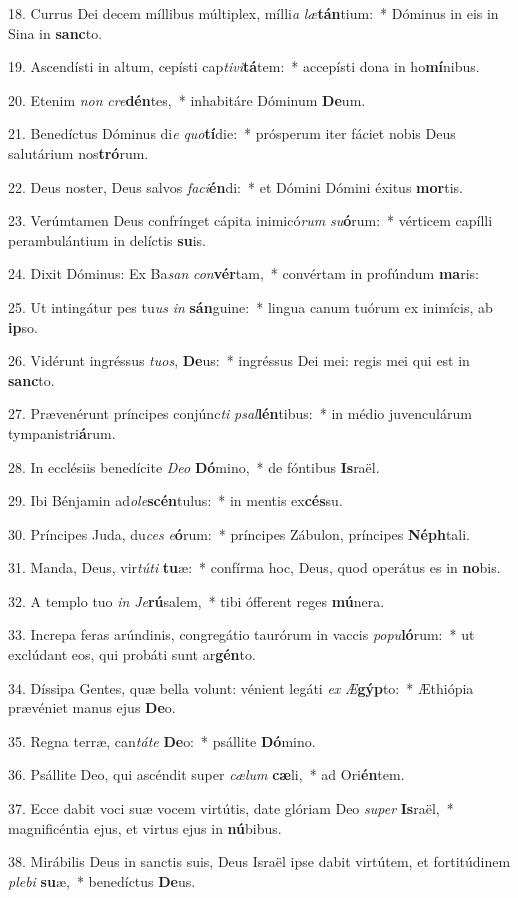 18. Currus Dei decem míllibus múltiplex, mílli\textit{a} \textit{læ}\textbf{tán}tium:~*  Dóminus in eis in Sina in \textbf{sanc}to.\

19. Ascendísti in altum, cepísti cap\textit{ti}\textit{vi}\textbf{tá}tem:~*  accepísti dona in ho\textbf{mí}nibus.\

20. Etenim \textit{non} \textit{cre}\textbf{dén}tes,~*  inhabitáre Dóminum \textbf{De}um.\

21. Benedíctus Dóminus di\textit{e} \textit{quo}\textbf{tí}die:~*  prósperum iter fáciet nobis Deus salutárium nos\textbf{tró}rum.\

22. Deus noster, Deus salvos \textit{fa}\textit{ci}\textbf{én}di:~*  et Dómini Dómini éxitus \textbf{mor}tis.\

23. Verúmtamen Deus confrínget cápita inimicó\textit{rum} \textit{su}\textbf{ó}rum:~*  vérticem capílli perambulántium in delíctis \textbf{su}is.\

24. Dixit Dóminus: Ex Ba\textit{san} \textit{con}\textbf{vér}tam,~*  convértam in profúndum \textbf{ma}ris:\

25. Ut intingátur pes tu\textit{us} \textit{in} \textbf{sán}guine:~*  lingua canum tuórum ex inimícis, ab \textbf{ip}so.\

26. Vidérunt ingréssus \textit{tu}\textit{os}, \textbf{De}us:~*  ingréssus Dei mei: regis mei qui est in \textbf{sanc}to.\

27. Prævenérunt príncipes conjúnc\textit{ti} \textit{psal}\textbf{lén}tibus:~*  in médio juvenculárum tympanistri\textbf{á}rum.\

28. In ecclésiis benedícite \textit{De}\textit{o} \textbf{Dó}mino,~*  de fóntibus \textbf{Is}raël.\

29. Ibi Bénjamin ad\textit{o}\textit{le}\textbf{scén}tulus:~*  in mentis ex\textbf{cés}su.\

30. Príncipes Juda, du\textit{ces} \textit{e}\textbf{ó}rum:~*  príncipes Zábulon, príncipes \textbf{Néph}tali.\

31. Manda, Deus, vir\textit{tú}\textit{ti} \textbf{tu}æ:~*  confírma hoc, Deus, quod operátus es in \textbf{no}bis.\

32. A templo tuo \textit{in} \textit{Je}\textbf{rú}salem,~*  tibi ófferent reges \textbf{mú}nera.\

33. Increpa feras arúndinis, congregátio taurórum in vaccis \textit{po}\textit{pu}\textbf{ló}rum:~*  ut exclúdant eos, qui probáti sunt ar\textbf{gén}to.\

34. Díssipa Gentes, quæ bella volunt: vénient legáti \textit{ex} \textit{Æ}\textbf{gýp}to:~*  Æthiópia prævéniet manus ejus \textbf{De}o.\

35. Regna terræ, can\textit{tá}\textit{te} \textbf{De}o:~*  psállite \textbf{Dó}mino.\

36. Psállite Deo, qui ascéndit super \textit{cæ}\textit{lum} \textbf{cæ}li,~*  ad Ori\textbf{én}tem.\

37. Ecce dabit voci suæ vocem virtútis, date glóriam Deo \textit{su}\textit{per} \textbf{Is}raël,~*  magnificéntia ejus, et virtus ejus in \textbf{nú}bibus.\

38. Mirábilis Deus in sanctis suis, Deus Israël ipse dabit virtútem, et fortitúdinem \textit{ple}\textit{bi} \textbf{su}æ,~*  benedíctus \textbf{De}us.\

